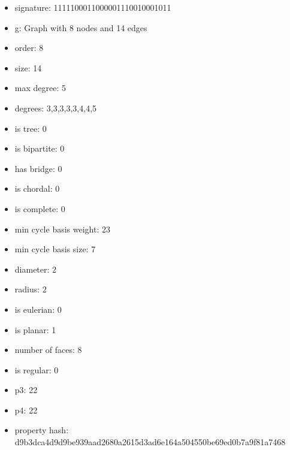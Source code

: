 \begin{itemize}
\item signature: 1111100011000001110010001011
\item g: Graph with 8 nodes and 14 edges
\item order: 8
\item size: 14
\item max degree: 5
\item degrees: 3,3,3,3,3,4,4,5
\item is tree: 0
\item is bipartite: 0
\item has bridge: 0
\item is chordal: 0
\item is complete: 0
\item min cycle basis weight: 23
\item min cycle basis size: 7
\item diameter: 2
\item radius: 2
\item is eulerian: 0
\item is planar: 1
\item number of faces: 8
\item is regular: 0
\item p3: 22
\item p4: 22
\item property hash: d9b3dca4d9d9be939aad2680a2615d3ad6e164a504550be69ed0b7a9f81a7468
\end{itemize}
\newpage
\begin{figure}
\end{figure}
